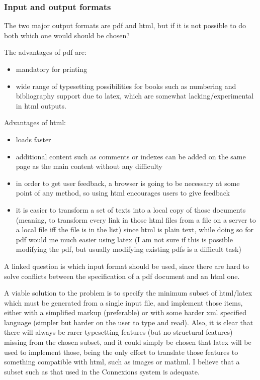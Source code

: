 \documentclass[12pt]{article}
\begin{document}
  \subsubsection{Input and output formats}
  
  The two major output formats are pdf and html, but if it is not possible to do both which one would should be chosen?
  
  The advantages of pdf are:
  
  \begin{itemize}
    \item mandatory for printing
    \item wide range of typesetting possibilities for books such as numbering and bibliography support due to latex, which are somewhat lacking/experimental in html outputs.
  \end{itemize}
  
  Advantages of html:
  
  \begin{itemize}
    \item loads faster
    \item additional content such as comments or indexes can be added on the same page as the main content without any difficulty
    \item in order to get user feedback, a browser is going to be necessary at some point of any method, so using html encourages users to give feedback
    \item it is easier to transform a set of texts into a local copy of those documents (meaning, to transform every link in those html files from a file on a server to a local file iff the file is in the list) since html is plain text, while doing so for pdf  would me much easier using latex (I am not sure if this is possible modifying the pdf, but usually modifying existing pdfs is a difficult task)
  \end{itemize}

  A linked question is which input format should be used, since there are hard to solve conflicts between the specification of a pdf document and an html one.
  
  A viable solution to the problem is to specify the minimum subset of html/latex which must be generated from a single input file, and implement those items, either with a simplified markup (preferable) or with some harder xml specified language (simpler but harder on the user to type and read). Also, it is clear that there will always be rarer typesetting features (but no structural features) missing from the chosen subset, and it could simply be chosen that latex will be used to implement those, being the only effort to translate those features to something compatible with html, such as images or mathml. I believe that a subset such as that used in the Connexions \cite{Co12} system is adequate.
\end{document}
